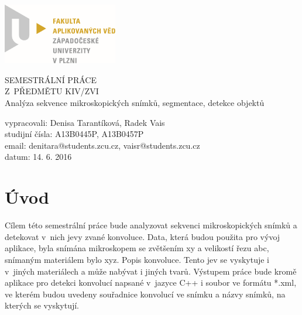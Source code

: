 \documentclass[12pt, a4paper]{report}
\begin{document}
	\begin{titlepage}
	\includegraphics[width=5cm,natwidth=601,natheight=314]{obrazky/logo.png}
		
	\vspace{4cm}
		\begin {center}
		{\Huge SEMESTRÁLNÍ PRÁCE\\ Z~PŘEDMĚTU KIV/ZVI\\}
		\vspace{1cm}
		{\huge Analýza sekvence mikroskopických snímků, segmentace, detekce objektů\\}
		\end {center}
	\vspace{6cm}
			
	\noindent vypracovali: Denisa Tarantíková, Radek Vais \\
				studijní čísla: A13B0445P, A13B0457P\\
				email:	denitara@students.zcu.cz, vaisr@students.zcu.cz\\
				datum:	14. 6. 2016
	\end{titlepage}

\tableofcontents
\chapter{Úvod}
	Cílem této semestrální práce bude analyzovat sekvenci mikroskopických snímků a detekovat v~nich jevy zvané konvoluce. Data, která budou použita pro vývoj aplikace, byla snímána mikroskopem se zvětšením xy a velikostí řezu abc, snímaným materiálem bylo xyz. Popis konvoluce. Tento jev se vyskytuje i v~jiných materiálech a může nabývat i jiných tvarů. Výstupem práce bude kromě aplikace pro detekci konvolucí napsané v~jazyce C++ i soubor ve formátu *.xml, ve kterém budou uvedeny souřadnice konvolucí ve snímku a názvy snímků, na kterých se vyskytují.
\end{document}
